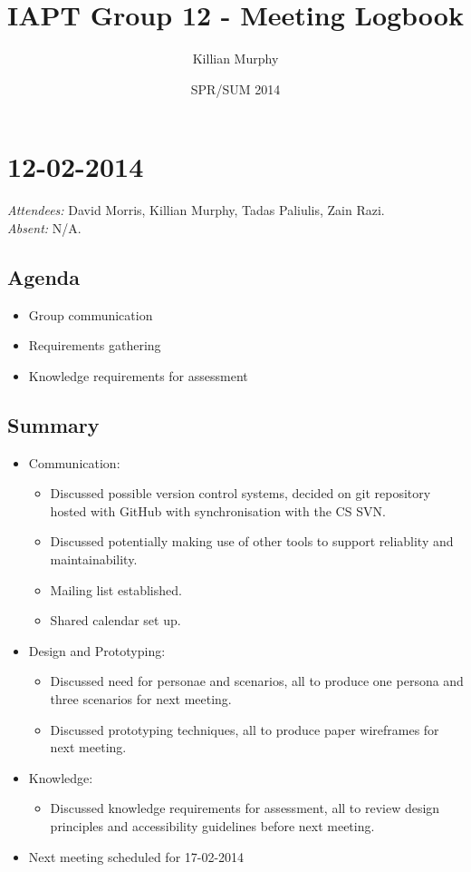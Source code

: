 \documentclass{article}
\title{IAPT Group 12 - Meeting Logbook}
\date{SPR/SUM 2014}
\author{Killian Murphy}
\begin{document}
\maketitle
\clearpage

\section*{12-02-2014}
\vspace{.5cm}
\emph{Attendees: }David Morris, Killian Murphy, Tadas Paliulis, Zain Razi.
\\
\emph{Absent: }N/A.

\subsection*{Agenda}
\begin{itemize}
\item Group communication
\item Requirements gathering
\item Knowledge requirements for assessment
\end{itemize}

\subsection*{Summary}
\begin{itemize}
\item Communication: 
  \begin {itemize}
  \item Discussed possible version control systems, decided on git repository hosted with GitHub with synchronisation with the CS SVN. 
  \item Discussed potentially making use of other tools to support reliablity and maintainability.
  \item Mailing list established.
  \item Shared calendar set up.
  \end{itemize}
\item Design and Prototyping:
  \begin{itemize}
  \item Discussed need for personae and scenarios, all to produce one persona and three scenarios for next meeting.
  \item Discussed prototyping techniques, all to produce paper wireframes for next meeting.
  \end{itemize}
\item Knowledge:
  \begin{itemize}
  \item Discussed knowledge requirements for assessment, all to review design principles and accessibility guidelines before next meeting.
  \end{itemize}
\item Next meeting scheduled for 17-02-2014
\end{itemize}
\end{document}
